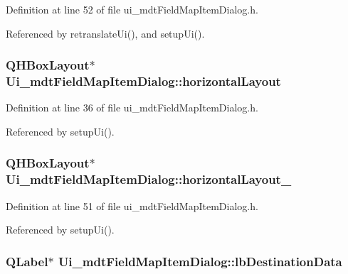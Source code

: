 Definition at line 52 of file ui\-\_\-mdt\-Field\-Map\-Item\-Dialog.\-h.



Referenced by retranslate\-Ui(), and setup\-Ui().

\hypertarget{class_ui__mdt_field_map_item_dialog_ab9bbd7e3f5754f832905d30529024094}{
\subsubsection[{horizontal\-Layout}]{\setlength{\rightskip}{0pt plus 5cm}Q\-H\-Box\-Layout$\ast$ Ui\-\_\-mdt\-Field\-Map\-Item\-Dialog\-::horizontal\-Layout}}\label{class_ui__mdt_field_map_item_dialog_ab9bbd7e3f5754f832905d30529024094}


Definition at line 36 of file ui\-\_\-mdt\-Field\-Map\-Item\-Dialog.\-h.



Referenced by setup\-Ui().

\hypertarget{class_ui__mdt_field_map_item_dialog_a0a493718783e5f100c327f28a8744627}{
\subsubsection[{horizontal\-Layout\-\_\-2}]{\setlength{\rightskip}{0pt plus 5cm}Q\-H\-Box\-Layout$\ast$ Ui\-\_\-mdt\-Field\-Map\-Item\-Dialog\-::horizontal\-Layout\-\_}}\label{class_ui__mdt_field_map_item_dialog_a0a493718783e5f100c327f28a8744627}


Definition at line 51 of file ui\-\_\-mdt\-Field\-Map\-Item\-Dialog.\-h.



Referenced by setup\-Ui().

\hypertarget{class_ui__mdt_field_map_item_dialog_a72b7328bf5e2750ca3288a2c723937e4}{
\subsubsection[{lb\-Destination\-Data}]{\setlength{\rightskip}{0pt plus 5cm}Q\-Label$\ast$ Ui\-\_\-mdt\-Field\-Map\-Item\-Dialog\-::lb\-Destination\-Data}}\label{class_ui__mdt_field_map_item_dialog_a72b7328bf5e2750ca3288a2c723937e4}


